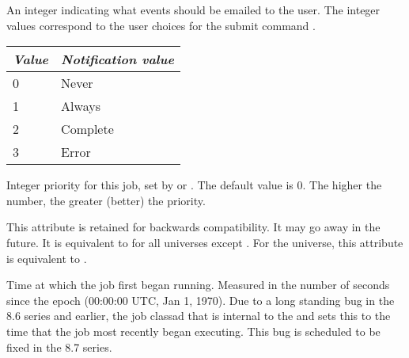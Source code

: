 \begin{description}
\item[\AdAttr{JobNotification}:] An integer indicating what events should
be emailed to the user. The integer values correspond to the user 
choices for the submit command .
\begin{center}
\begin{table}[hbt]
\begin{tabular}{|p{2cm}p{10cm}|} \hline
\emph{Value} & \emph{Notification value} \\ \hline \hline
0 & Never \\ \hline
1 & Always \\ \hline
2 & Complete \\ \hline
3 & Error \\ \hline
\end{tabular}
\end{table}
\end{center}

\item[\AdAttr{JobPrio}:]  Integer priority for this job, set by
 or .  The default value is 0.  The higher
the number, the greater (better) the priority.

\item[\AdAttr{JobRunCount}:]  This attribute is retained for backwards
  compatibility.  It may go away in the future.  It is equivalent to
   for all universes except .
  For the  universe, this attribute is equivalent to
  .

\item[\AdAttr{JobStartDate}:]  Time at which the job first began
running.  Measured in the
number of seconds since the epoch (00:00:00 UTC, Jan 1, 1970).
Due to a long standing bug in the 8.6 series and earlier, the job classad that is internal to the
 and  sets this to the time that the job most
recently began executing.  This bug is scheduled to be fixed in the 8.7 series.


\end{description}

